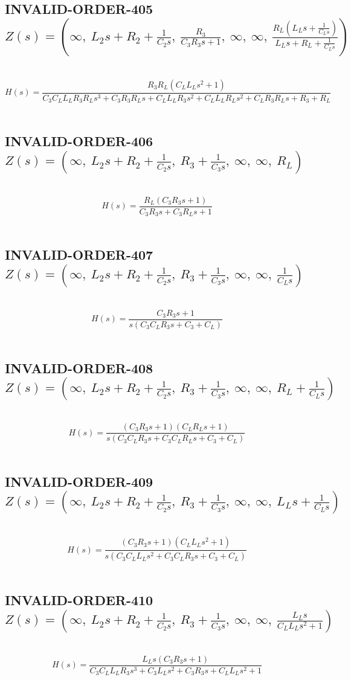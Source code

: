 \documentclass{article}
\begin{document}
\subsection{INVALID-ORDER-405 $Z(s) = \left( \infty, \  L_{2} s + R_{2} + \frac{1}{C_{2} s}, \  \frac{R_{3}}{C_{3} R_{3} s + 1}, \  \infty, \  \infty, \  \frac{R_{L} \left(L_{L} s + \frac{1}{C_{L} s}\right)}{L_{L} s + R_{L} + \frac{1}{C_{L} s}}\right)$ } \ 
\textbf{\[H(s) = \frac{R_{3} R_{L} \left(C_{L} L_{L} s^{2} + 1\right)}{C_{3} C_{L} L_{L} R_{3} R_{L} s^{3} + C_{3} R_{3} R_{L} s + C_{L} L_{L} R_{3} s^{2} + C_{L} L_{L} R_{L} s^{2} + C_{L} R_{3} R_{L} s + R_{3} + R_{L}}\] } \ 
\subsection{INVALID-ORDER-406 $Z(s) = \left( \infty, \  L_{2} s + R_{2} + \frac{1}{C_{2} s}, \  R_{3} + \frac{1}{C_{3} s}, \  \infty, \  \infty, \  R_{L}\right)$ } \ 
\textbf{\[H(s) = \frac{R_{L} \left(C_{3} R_{3} s + 1\right)}{C_{3} R_{3} s + C_{3} R_{L} s + 1}\] } \ 
\subsection{INVALID-ORDER-407 $Z(s) = \left( \infty, \  L_{2} s + R_{2} + \frac{1}{C_{2} s}, \  R_{3} + \frac{1}{C_{3} s}, \  \infty, \  \infty, \  \frac{1}{C_{L} s}\right)$ } \ 
\textbf{\[H(s) = \frac{C_{3} R_{3} s + 1}{s \left(C_{3} C_{L} R_{3} s + C_{3} + C_{L}\right)}\] } \ 
\subsection{INVALID-ORDER-408 $Z(s) = \left( \infty, \  L_{2} s + R_{2} + \frac{1}{C_{2} s}, \  R_{3} + \frac{1}{C_{3} s}, \  \infty, \  \infty, \  R_{L} + \frac{1}{C_{L} s}\right)$ } \ 
\textbf{\[H(s) = \frac{\left(C_{3} R_{3} s + 1\right) \left(C_{L} R_{L} s + 1\right)}{s \left(C_{3} C_{L} R_{3} s + C_{3} C_{L} R_{L} s + C_{3} + C_{L}\right)}\] } \ 
\subsection{INVALID-ORDER-409 $Z(s) = \left( \infty, \  L_{2} s + R_{2} + \frac{1}{C_{2} s}, \  R_{3} + \frac{1}{C_{3} s}, \  \infty, \  \infty, \  L_{L} s + \frac{1}{C_{L} s}\right)$ } \ 
\textbf{\[H(s) = \frac{\left(C_{3} R_{3} s + 1\right) \left(C_{L} L_{L} s^{2} + 1\right)}{s \left(C_{3} C_{L} L_{L} s^{2} + C_{3} C_{L} R_{3} s + C_{3} + C_{L}\right)}\] } \ 
\subsection{INVALID-ORDER-410 $Z(s) = \left( \infty, \  L_{2} s + R_{2} + \frac{1}{C_{2} s}, \  R_{3} + \frac{1}{C_{3} s}, \  \infty, \  \infty, \  \frac{L_{L} s}{C_{L} L_{L} s^{2} + 1}\right)$ } \ 
\textbf{\[H(s) = \frac{L_{L} s \left(C_{3} R_{3} s + 1\right)}{C_{3} C_{L} L_{L} R_{3} s^{3} + C_{3} L_{L} s^{2} + C_{3} R_{3} s + C_{L} L_{L} s^{2} + 1}\] } \ 
\end{document}
